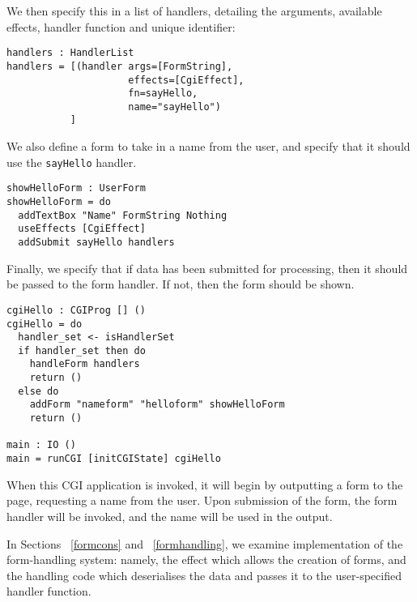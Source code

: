 \documentclass[preprint]{sigplanconf}
\begin{document}
We then specify this in a list of handlers, detailing the arguments, available effects, handler function and unique identifier:

\begin{Verbatim}
handlers : HandlerList
handlers = [(handler args=[FormString], 
                     effects=[CgiEffect], 
                     fn=sayHello, 
                     name="sayHello")
           ]
\end{Verbatim}

We also define a form to take in a name from the user, and specify that it should use the \texttt{sayHello} handler.

\begin{Verbatim}
showHelloForm : UserForm
showHelloForm = do
  addTextBox "Name" FormString Nothing
  useEffects [CgiEffect]
  addSubmit sayHello handlers
\end{Verbatim}

Finally, we specify that if data has been submitted for processing, then it should be passed to the form handler. If not, then the form should be shown.

\begin{Verbatim}
cgiHello : CGIProg [] ()
cgiHello = do
  handler_set <- isHandlerSet
  if handler_set then do
    handleForm handlers
    return ()
  else do
    addForm "nameform" "helloform" showHelloForm
    return ()

main : IO ()
main = runCGI [initCGIState] cgiHello
\end{Verbatim}
When this CGI application is invoked, it will begin by outputting a form to the
page, requesting a name from the user. Upon submission of the form, the form
handler will be invoked, and the name will be used in the output.

In Sections ~\ref{formcons} and ~\ref{formhandling}, we examine implementation
of the form-handling system: namely, the effect which allows the creation of
forms, and the handling code which deserialises the data and passes it to the
user-specified handler function.  
\end{document}
